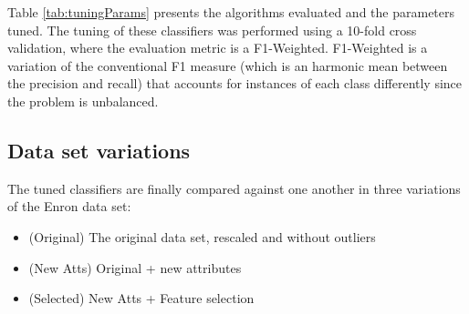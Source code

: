\documentclass[11pt]{article}
\begin{document}
		Table \ref{tab:tuningParams} presents the algorithms evaluated and the parameters tuned.
		The tuning of these classifiers was performed using a 10-fold cross validation, where the evaluation metric is a F1-Weighted.
		F1-Weighted is a variation of the conventional F1 measure (which is an harmonic mean between the precision and recall) that accounts for instances of each class differently since the problem is unbalanced.
		

	\begin{table*}[!t]
		\centering
		\caption{Algorithms' parameters used for tuning.}
		\label{tab:tuningParams}
	\end{table*}

	\subsection{Data set variations}
	
		The tuned classifiers are finally compared against one another in three variations of the Enron data set:
		\begin{itemize}
			\item (Original) The original data set, rescaled and without outliers
			\item (New Atts) Original + new attributes
			\item (Selected) New Atts + Feature selection
		\end{itemize}
		
\end{document}
